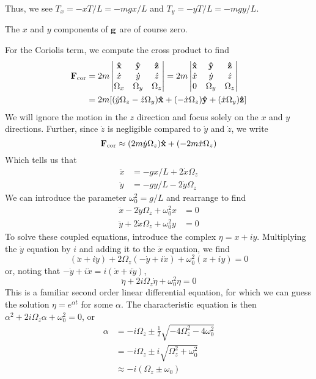 Thus, we see $T_x = -xT/L = -mgx/L$ and $T_y = -yT/L = -mgy/L$. 

The $x$ and $y$ components of $\mathbf{g}$ are of course zero.

For the Coriolis term, we compute the cross product to find
\begin{align*}
    \mbf F_\text{cor} &= 2m\begin{vmatrix}
        \xhat & \yhat & \zhat \\
        \dot x & \dot y & \dot z \\
        \Omega_x & \Omega_y & \Omega_z
    \end{vmatrix} =2m\begin{vmatrix}
        \xhat & \yhat & \zhat \\
        \dot x & \dot y & \dot z \\
        0 & \Omega_y & \Omega_z
    \end{vmatrix} \\
    &= 2m\bqty{\pqty{\dot y\Omega_z - \dot z\Omega_y}\xhat + (-\dot x\Omega_z)\yhat + (\dot x\Omega_y)\zhat}
\end{align*}
We will ignore the motion in the $z$ direction and focus solely on the $x$ and $y$ directions. Further, since $\dot z$ is negligible compared to $\dot y$ and $\dot z$, we write
\[ \mathbf{F}_\text{cor} \approx (2m\dot y\Omega_z)\mathbf{\hat{x}} + (-2m\dot x\Omega_z)\]
Which tells us that
\begin{align*}
    \ddot x &= -gx/L + 2\dot x\Omega_z \\
    \ddot y &= -gy/L - 2\dot y\Omega_z
\end{align*}
We can introduce the parameter $\omega_0^2 = g/L$ and rearrange to find
\begin{align*}
    \ddot x -  2\dot y\Omega_z +\omega_0^2x &= 0\\
    \ddot y + 2\dot x\Omega_z + \omega_0^2y &= 0
\end{align*}
To solve these coupled equations, introduce the complex $\eta = x+iy$. Multiplying the $\ddot y$ equation by $i$ and adding it to the $\ddot x$ equation, we find
\[ (\ddot x +i\ddot y) +2\Omega_z(-\dot y+ i\dot x) + \omega_0^2(x+iy) = 0\]
or, noting that $-\dot y + i\dot x = i(\dot x+i\dot y)$,
\[ \ddot\eta + 2i\Omega_z\dot \eta + \omega_0^2\eta = 0\]
This is a familiar second order linear differential equation, for which we can guess the solution $\eta = e^{\alpha t}$ for some $\alpha$. The characteristic equation is then $\alpha^2 +2i\Omega_z\alpha + \omega_0^2 = 0$, or
\begin{align*}
    \alpha &= -i\Omega_z \pm \frac{1}{2}\sqrt{-4\Omega_z^2 - 4\omega_0^2} \\
    &= -i\Omega_z \pm i\sqrt{\Omega_z^2+\omega_0^2} \\
    &\approx -i(\Omega_z \pm \omega_0)
\end{align*}
